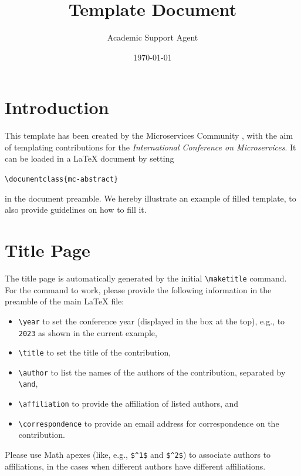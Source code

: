 \documentclass{article}
\title{Template Document}
\author{Academic Support Agent}
\date{\today}
\begin{document}
\maketitle

\maketitle


\section{Introduction}
This template has been created by the Microservices Community \cite{MicroservicesCommunity}, with the aim of templating contributions for the \textit{International Conference on Microservices}. 
It can be loaded in a \LaTeX{} document by setting
\begin{center}
    \verb|\documentclass{mc-abstract}|
\end{center}
in the document preamble.
We hereby illustrate an example of filled template, to also provide guidelines on how to fill it.

\section{Title Page}
The title page is automatically generated by the initial \verb|\maketitle| command. For the command to work, please provide the following information in the preamble of the main \LaTeX{} file: 
\begin{itemize}
    \item \verb|\year| to set the conference year (displayed in the box at the top), e.g., to \verb|2023| as shown in the current example,
    \item \verb|\title| to set the title of the contribution,
    \item \verb|\author| to list the names of the authors of the contribution, separated by \verb|\and|, 
    \item \verb|\affiliation| to provide the affiliation of listed authors, and
    \item \verb|\correspondence| to provide an email address for correspondence on the contribution.
\end{itemize}
Please use Math apexes (like, e.g., \verb|$^1$| and \verb|$^2$|) to associate authors to affiliations, in the cases when different authors have different affiliations.
\end{document}
